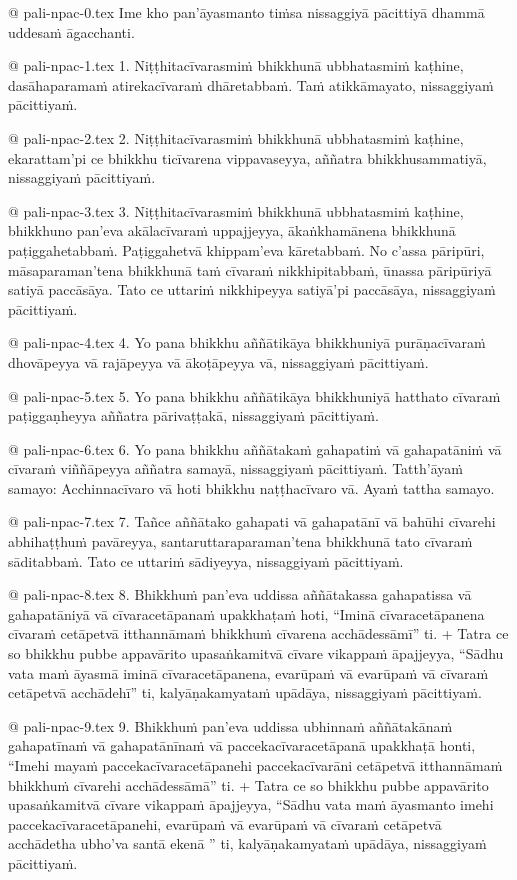 @ pali-npac-0.tex
Ime kho pan’āyasmanto tiṁsa nissaggiyā pācittiyā dhammā uddesaṁ āgacchanti.

@ pali-npac-1.tex
1. Niṭṭhitacīvarasmiṁ bhikkhunā ubbhatasmiṁ kaṭhine, dasāhaparamaṁ atirekacīvaraṁ dhāretabbaṁ. Taṁ atikkāmayato, nissaggiyaṁ pācittiyaṁ.

@ pali-npac-2.tex
2. Niṭṭhitacīvarasmiṁ bhikkhunā ubbhatasmiṁ kaṭhine, ekarattam’pi ce bhikkhu ticīvarena vippavaseyya, aññatra bhikkhusammatiyā, nissaggiyaṁ pācittiyaṁ.

@ pali-npac-3.tex
3. Niṭṭhitacīvarasmiṁ bhikkhunā ubbhatasmiṁ kaṭhine, bhikkhuno pan’eva akālacīvaraṁ uppajjeyya, ākaṅkhamānena bhikkhunā paṭiggahetabbaṁ. Paṭiggahetvā khippam’eva kāretabbaṁ. No c’assa pāripūri, māsaparaman’tena bhikkhunā taṁ cīvaraṁ nikkhipitabbaṁ, ūnassa pāripūriyā satiyā paccāsāya. Tato ce uttariṁ nikkhipeyya satiyā’pi paccāsāya, nissaggiyaṁ pācittiyaṁ.

@ pali-npac-4.tex
4. Yo pana bhikkhu aññātikāya bhikkhuniyā purāṇacīvaraṁ dhovāpeyya vā rajāpeyya vā ākoṭāpeyya vā, nissaggiyaṁ pācittiyaṁ.

@ pali-npac-5.tex
5. Yo pana bhikkhu aññātikāya bhikkhuniyā hatthato cīvaraṁ paṭiggaṇheyya aññatra pārivaṭṭakā, nissaggiyaṁ pācittiyaṁ.

@ pali-npac-6.tex
6. Yo pana bhikkhu aññātakaṁ gahapatiṁ vā gahapatāniṁ vā cīvaraṁ viññāpeyya aññatra samayā, nissaggiyaṁ pācittiyaṁ. Tatth’āyaṁ samayo: Acchinnacīvaro vā hoti bhikkhu naṭṭhacīvaro vā. Ayaṁ tattha samayo.

@ pali-npac-7.tex
7. Tañce aññātako gahapati vā gahapatānī vā bahūhi cīvarehi abhihaṭṭhuṁ pavāreyya, santaruttaraparaman’tena bhikkhunā tato cīvaraṁ sāditabbaṁ. Tato ce uttariṁ sādiyeyya, nissaggiyaṁ pācittiyaṁ.

@ pali-npac-8.tex
8. Bhikkhuṁ pan’eva uddissa aññātakassa gahapatissa vā gahapatāniyā vā cīvaracetāpanaṁ upakkhaṭaṁ hoti, “Iminā cīvaracetāpanena cīvaraṁ cetāpetvā itthannāmaṁ bhikkhuṁ cīvarena acchādessāmī” ti. +
Tatra ce so bhikkhu pubbe appavārito upasaṅkamitvā cīvare vikappaṁ āpajjeyya, “Sādhu vata maṁ āyasmā iminā cīvaracetāpanena, evarūpaṁ vā evarūpaṁ vā cīvaraṁ cetāpetvā acchādehī” ti, kalyāṇakamyataṁ upādāya, nissaggiyaṁ pācittiyaṁ.

@ pali-npac-9.tex
9. Bhikkhuṁ pan’eva uddissa ubhinnaṁ aññātakānaṁ gahapatīnaṁ vā gahapatānīnaṁ vā paccekacīvaracetāpanā upakkhaṭā honti, “Imehi mayaṁ paccekacīvaracetāpanehi paccekacīvarāni cetāpetvā itthannāmaṁ bhikkhuṁ cīvarehi acchādessāmā” ti. +
Tatra ce so bhikkhu pubbe appavārito upasaṅkamitvā cīvare vikappaṁ āpajjeyya, “Sādhu vata maṁ āyasmanto imehi paccekacīvaracetāpanehi, evarūpaṁ vā evarūpaṁ vā cīvaraṁ cetāpetvā acchādetha ubho’va santā ekenā ” ti, kalyāṇakamyataṁ upādāya, nissaggiyaṁ pācittiyaṁ.

